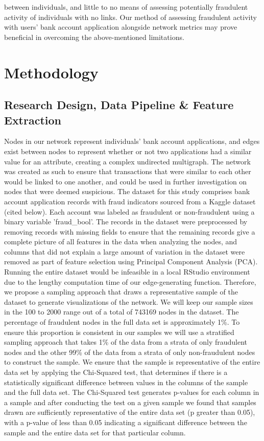 \documentclass{styles/svproc}
\begin{document}
between individuals, and little to no means of assessing potentially fraudulent activity of individuals with no links. Our method of assessing fraudulent activity with users' bank account application alongside network metrics may prove beneficial in overcoming the above-mentioned limitations. 

\section{Methodology}

\subsection*{Research Design, Data Pipeline \& Feature Extraction}
Nodes in our network represent individuals' bank account applications, and edges exist between nodes to represent whether or not two applications had a similar value for an attribute, creating a complex undirected multigraph. The network was created as such to ensure that transactions that were similar to each other would be linked to one another, and could be used in further investigation on nodes that were deemed suspicious. The dataset for this study comprises bank account application records with fraud indicators sourced from a Kaggle dataset (cited below). Each account was labeled as fraudulent or non-fraudulent using a binary variable ’fraud\_bool’. The records in the dataset were preprocessed by removing records with missing fields to ensure that the remaining records give a complete picture of all features in the data when analyzing the nodes, and columns that did not explain a large amount of variation in the dataset were removed as part of feature selection using Principal Component Analysis (PCA). Running the entire dataset would be infeasible in a local RStudio environment due to the lengthy computation time of our edge-generating function. Therefore, we propose a sampling approach that draws a representative sample of the dataset to generate visualizations of the network. We will keep our sample sizes in the 100 to 2000 range out of a total of 743169 nodes in the dataset. The percentage of fraudulent nodes in the full data set is approximately 1\%. To ensure this proportion is consistent in our samples we will use a stratified sampling approach that takes 1\% of the data from a strata of only fraudulent nodes and the other 99\% of the data from a strata of only non-fraudulent nodes to construct the sample. We ensure that the sample is representative of the entire data set by applying the Chi-Squared test, that determines if there is a statistically significant difference between values in the columns of the sample and the full data set. The Chi-Squared test generates p-values for each column in a sample and after conducting the test on a given sample we found that samples drawn are sufficiently representative of the entire data set (p greater than 0.05), with a p-value of less than 0.05 indicating a significant difference between the sample and the entire data set for that particular column. 
\end{document}
